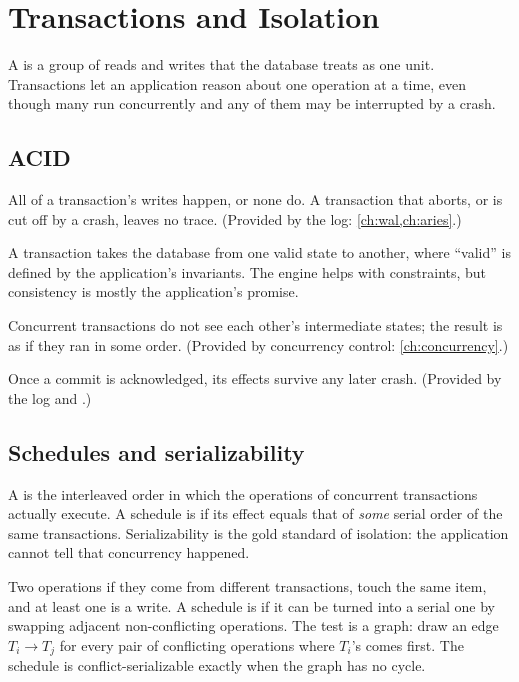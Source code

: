 \chapter{Transactions and Isolation}
\label{ch:transactions}

A  is a group of reads and writes that the database treats as
one unit. Transactions let an application reason about one operation at a time,
even though many run concurrently and any of them may be interrupted by a crash.

\section{ACID}

\begin{description}[leftmargin=1.2em]
\item[Atomicity.] All of a transaction's writes happen, or none do. A transaction that aborts, or is cut off by a crash, leaves no trace. (Provided by the log: \cref{ch:wal,ch:aries}.)
\item[Consistency.] A transaction takes the database from one valid state to another, where ``valid'' is defined by the application's invariants. The engine helps with constraints, but consistency is mostly the application's promise.
\item[Isolation.] Concurrent transactions do not see each other's intermediate states; the result is as if they ran in some order. (Provided by concurrency control: \cref{ch:concurrency}.)
\item[Durability.] Once a commit is acknowledged, its effects survive any later crash. (Provided by the log and .)
\end{description}

\section{Schedules and serializability}

A  is the interleaved order in which the operations of
concurrent transactions actually execute. A schedule is  if
its effect equals that of \emph{some} serial order of the same transactions.
Serializability is the gold standard of isolation: the application cannot tell
that concurrency happened.

Two operations  if they come from different transactions, touch
the same item, and at least one is a write. A schedule is
 if it can be turned into a serial one by swapping
adjacent non-conflicting operations. The test is a graph: draw an edge
$T_i \to T_j$ for every pair of conflicting operations where $T_i$'s comes
first. The schedule is conflict-serializable exactly when the graph has no cycle.

